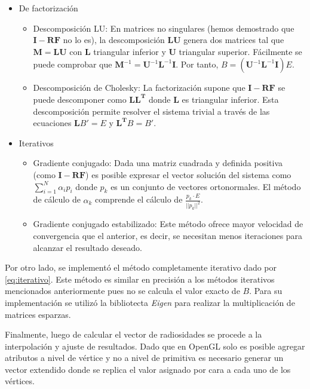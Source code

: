 \begin{itemize}
	\item{De factorización}
		\begin{itemize}
			\item{Descomposición LU:} En matrices no singulares (hemos demostrado que $\mathbf{I - RF}$ no lo es), la descomposición $\mathbf{LU}$ genera dos matrices tal que $\mathbf{M} = \mathbf{LU}$ con $\mathbf{L}$ triangular inferior y $\mathbf{U}$ triangular superior. Fácilmente se puede comprobar que  $\mathbf{M}^{-1} = \mathbf{U}^{-1} \mathbf{L}^{-1} \mathbf{I}$. Por tanto, $B =(\mathbf{U}^{-1} \mathbf{L}^{-1} \mathbf{I})E$. 
			\item{Descomposición de Cholesky:} La factorización supone que  $\mathbf{I - RF}$ se puede descomponer como  $\mathbf{LL^{T}}$ donde  $\mathbf{L}$ es triangular inferior. Esta descomposición permite resolver el sistema trivial a través de las ecuaciones $\mathbf{L}B' = E$ y $\mathbf{L^{T}}B = B'$.
			\end{itemize}
	\item{Iterativos}
			\begin{itemize}
			\item Gradiente conjugado:
				Dada una matriz cuadrada y definida positiva (como $\mathbf{I - RF}$) es posible expresar el vector solución del sistema como $\sum_{i=1}^{N} \alpha_{i}p_{i}$ donde $p_{k}$ es un conjunto de vectores ortonormales. El método de cálculo de $\alpha_{k}$ comprende el cálculo de $\frac{p_{k} \cdot E}{||p_{k}||^{2}}$.			\item Gradiente conjugado estabilizado: Este método ofrece mayor velocidad de convergencia que el anterior, es decir, se necesitan menos iteraciones para alcanzar el resultado deseado. 
		\end{itemize}
\end{itemize}

Por otro lado, se implementó el método completamente iterativo dado por \eqref{eq:iterativo}. Este método es similar en precisión a los métodos iterativos  mencionados anteriormente pues no se calcula el valor exacto de $B$. Para su implementación se utilizó la bibliotecta \textit{Eigen} para realizar la multiplicación de matrices esparzas.

Finalmente, luego de calcular el vector de radiosidades se procede a la interpolación y ajuste de resultados. Dado que en OpenGL solo es posible agregar atributos a nivel de vértice y no a nivel de primitiva es necesario generar un vector extendido donde se replica el valor asignado por cara a cada uno de los vértices.

